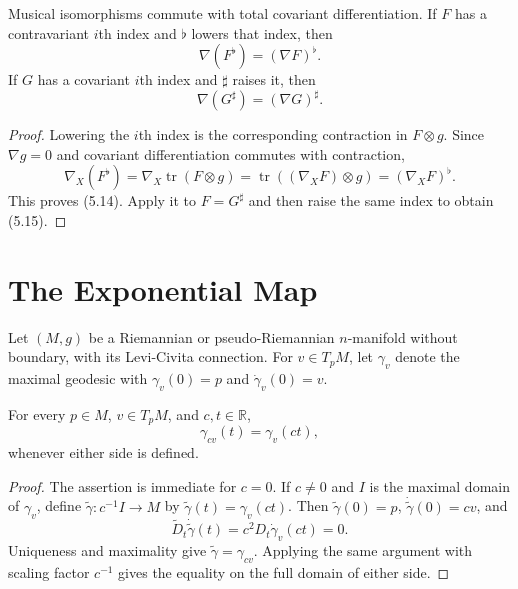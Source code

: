 \begin{proposition}
\label{prop:musical-isomorphisms-commute}

Musical isomorphisms commute with total covariant differentiation. If $F$ has
a contravariant $i$th index and $\flat$ lowers that index, then
\begin{equation}
\nabla(F^\flat)=(\nabla F)^\flat.
\tag{5.14}
\end{equation}
If $G$ has a covariant $i$th index and $\sharp$ raises it, then
\begin{equation}
\nabla(G^\sharp)=(\nabla G)^\sharp.
\tag{5.15}
\end{equation}

\begin{proof}
\sketch Lowering the $i$th index is the corresponding contraction in
$F\otimes g$. Since $\nabla g=0$ and covariant differentiation commutes with
contraction,
\[
\nabla_X(F^\flat)
=\nabla_X\operatorname{tr}(F\otimes g)
=\operatorname{tr}((\nabla_XF)\otimes g)
=(\nabla_XF)^\flat.
\]
This proves (5.14). Apply it to $F=G^\sharp$ and then raise the same index to
obtain (5.15).
\end{proof}
\end{proposition}
\section{The Exponential Map}

Let $(M,g)$ be a Riemannian or pseudo-Riemannian $n$-manifold without boundary,
with its Levi-Civita connection.  For $v\in T_pM$, let $\gamma_v$ denote the
maximal geodesic with $\gamma_v(0)=p$ and $\dot\gamma_v(0)=v$.

\begin{lemma}
\label{lem:rescaling-lemma}

For every $p \in M$, $v \in T_p M$, and $c,t \in \mathbb{R}$,
\begin{equation}
\gamma_{cv}(t) = \gamma_v(ct), \tag{5.16}
\end{equation}
whenever either side is defined.

\begin{proof}
\sketch
The assertion is immediate for $c=0$.  If $c\ne0$ and $I$ is the maximal
domain of $\gamma_v$, define $\widetilde\gamma:c^{-1}I\to M$ by
$\widetilde\gamma(t)=\gamma_v(ct)$.  Then
$\widetilde\gamma(0)=p$, $\dot{\widetilde\gamma}(0)=cv$, and
\[
\widetilde D_t\dot{\widetilde\gamma}(t)
=c^2D_t\dot\gamma_v(ct)=0.
\]
Uniqueness and maximality give $\widetilde\gamma=\gamma_{cv}$.  Applying the
same argument with scaling factor $c^{-1}$ gives the equality on the full
domain of either side.
\end{proof}
\end{lemma}

